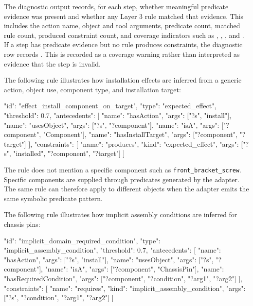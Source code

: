 The diagnostic output records, for each step, whether meaningful predicate evidence was present and whether any Layer 3 rule matched that evidence. This includes the action name, object and tool arguments, predicate count, matched rule count, produced constraint count, and coverage indicators such as , , , and . If a step has predicate evidence but no rule produces constraints, the diagnostic row records . This is recorded as a coverage warning rather than interpreted as evidence that the step is invalid.


The following rule illustrates how installation effects are inferred from a generic action, object use, component type, and installation target:

\begin{Code}
{
  "id": "effect_install_component_on_target",
  "type": "expected_effect",
  "threshold": 0.7,
  "antecedents": [
    {"name": "hasAction", "args": ["?s", "install"]},
    {"name": "usesObject", "args": ["?s", "?component"]},
    {"name": "isA", "args": ["?component", "Component"]},
    {"name": "hasInstallTarget", "args": ["?component", "?target"]}
  ],
  "constraints": [
    {
      "name": "produces",
      "kind": "expected_effect",
      "args": ["?s", "installed", "?component", "?target"]
    }
  ]
}
\end{Code}

The rule does not mention a specific component such as \texttt{front\_bracket\_screw}. Specific components are supplied through predicates generated by the adapter. The same rule can therefore apply to different objects when the adapter emits the same symbolic predicate pattern.

The following rule illustrates how implicit assembly conditions are inferred for chassis pins:

\begin{Code}
{
  "id": "implicit_domain_required_condition",
  "type": "implicit_assembly_condition",
  "threshold": 0.7,
  "antecedents": [
    {"name": "hasAction", "args": ["?s", "install"]},
    {"name": "usesObject", "args": ["?s", "?component"]},
    {"name": "isA", "args": ["?component", "ChassisPin"]},
    {"name": "hasRequiredCondition",
     "args": ["?component", "?condition", "?arg1", "?arg2"]}
  ],
  "constraints": [
    {
      "name": "requires",
      "kind": "implicit_assembly_condition",
      "args": ["?s", "?condition", "?arg1", "?arg2"]
    }
  ]
}
\end{Code}

